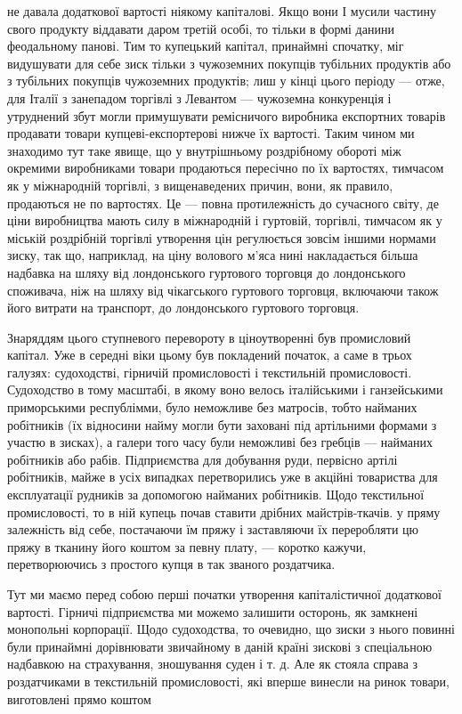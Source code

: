 \parcont{}  %
не давала додаткової вартості ніякому капіталові. Якщо вони І мусили частину свого продукту віддавати даром третій особі, то
тільки в формі данини феодальному панові. Тим то купецький капітал, принаймні спочатку, міг видушувати для себе зиск тільки
з чужоземних покупців тубільних продуктів або з тубільних покупців чужоземних продуктів; лиш у кінці цього періоду — отже,
для Італії з занепадом торгівлі з Левантом — чужоземна конкуренція і утруднений збут могли примушувати ремісничого виробника
експортних товарів продавати товари купцеві-експортерові нижче їх вартості. Таким чином ми знаходимо тут таке явище, що у
внутрішньому роздрібному обороті між окремими виробниками товари продаються пересічно по їх вартостях, тимчасом як у
міжнародній торгівлі, з вищенаведених причин, вони, як правило, продаються не по вартостях. Це — повна протилежність до
сучасного світу, де ціни виробництва мають силу в міжнародній і гуртовій, торгівлі, тимчасом як у міській роздрібній
торгівлі утворення цін регулюється зовсім іншими нормами зиску, так що, наприклад, на ціну волового м’яса нині накладається
більша надбавка на шляху від лондонського гуртового торговця до лондонського споживача, ніж на шляху від чікагського
гуртового торговця, включаючи також його витрати на транспорт, до лондонського гуртового торговця.

Знаряддям цього
ступневого перевороту в ціноутворенні був промисловий капітал. Уже в середні віки цьому був покладений початок, а саме в
трьох галузях: судоходстві, гірничій промисловості і текстильній промисловості. Судоходство в тому масштабі, в якому воно
велось італійськими і ганзейськими приморськими республімми, було неможливе без матросів, тобто найманих робітників (їх
відносини найму могли бути заховані під артільними формами з участю в зисках), а галери того часу були неможливі без гребців
— найманих робітників або рабів. Підприємства для добування руди, первісно артілі робітників, майже в усіх випадках
перетворились уже в акційні товариства для експлуатації рудників за допомогою найманих робітників. Щодо текстильної
промисловості, то в ній купець почав ставити дрібних майстрів-ткачів. у пряму залежність від себе, постачаючи їм пряжу і
заставляючи їх переробляти цю пряжу в тканину його коштом за певну плату, — коротко кажучи, перетворюючись з простого купця
в так званого роздатчика.

Тут ми маємо перед собою перші початки утворення капіталістичної додаткової вартості. Гірничі
підприємства ми можемо залишити осторонь, як замкнені монопольні корпорації. Щодо судоходства, то очевидно, що зиски з нього
повинні були принаймні дорівнювати звичайному в даній країні зискові з спеціальною надбавкою на страхування, зношування
суден і т. д. Але як стояла справа з роздатчиками в текстильній промисловості, які вперше винесли на ринок товари,
виготовлені прямо коштом
\parbreak{}  %
